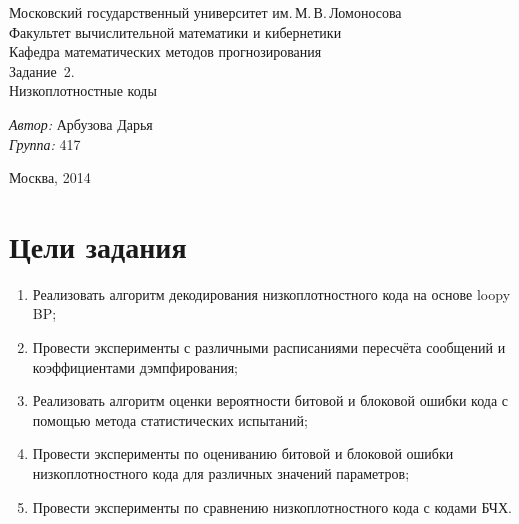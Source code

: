 \documentclass[12pt,a4paper,oneside,fleqn,leqno]{article}
\begin{document}
	\begin{titlepage}
		\begin{center}
			\large Московский государственный университет им.\,М.\,В.\,Ломоносова\\
			Факультет вычислительной математики и кибернетики \\
			Кафедра математических методов прогнозирования \\[4.5cm] 
			\Huge Задание \No\,2.\\Низкоплотностные коды\\[5.5cm]
		\end{center}
		\normalsize
		\begin{flushright}
			\emph{Автор:} Арбузова Дарья\\
			\emph{Группа:} 417\\
		\end{flushright}
		\vfill
		\begin{center}
			Москва, 2014
		\end{center}
	\end{titlepage}
	\tableofcontents
	\newpage
	\section{Цели задания}
		\begin{enumerate}
			\item
			Реализовать алгоритм декодирования низкоплотностного кода на основе loopy BP;
			\item
			Провести эксперименты с различными расписаниями пересчёта сообщений и коэффициентами дэмпфирования;
			\item
			Реализовать алгоритм оценки вероятности битовой и блоковой ошибки кода с помощью метода статистических испытаний;
			\item
			Провести эксперименты по оцениванию битовой и блоковой ошибки низкоплотностного кода для различных значений параметров;
			\item
			Провести эксперименты по сравнению низкоплотностного кода с кодами БЧХ.
		\end{enumerate}
\end{document}
